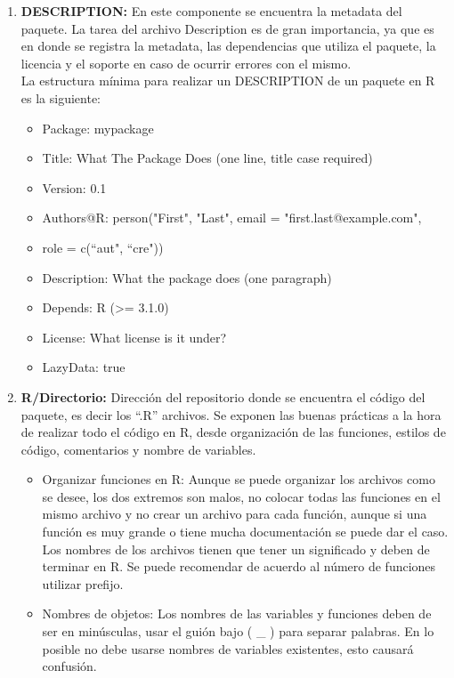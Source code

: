 \begin{enumerate}
  \item \textbf{ DESCRIPTION:} En este componente se encuentra la metadata del paquete. La tarea del archivo Description es de gran importancia, ya que es en donde se registra la metadata, las dependencias que utiliza el paquete, la licencia y el soporte en caso de ocurrir errores con el mismo.\\

La estructura m\'inima para realizar un DESCRIPTION de un paquete en R es la siguiente:

\begin{itemize}
\item Package: mypackage
\item Title: What The Package Does (one line, title case required)
\item Version: 0.1
\item Authors@R: person("First", "Last", email = "first.last@example.com",
\item role = c(``aut", ``cre"))
\item Description: What the package does (one paragraph)
\item Depends: R (>= 3.1.0)
\item License: What license is it under?
\item LazyData: true
\end{itemize}

 \item\textbf{ R/Directorio:}  Direcci\'on del repositorio donde se encuentra el c\'odigo del paquete, es decir los  ``.R'' archivos. Se exponen las buenas pr\'acticas a la hora de realizar todo el c\'odigo en R, desde organizaci\'on de las funciones, estilos de c\'odigo, comentarios y nombre de variables. 
\begin{itemize}
\item Organizar funciones en R: Aunque se puede organizar los archivos como se desee, los dos extremos son malos, no colocar todas las funciones en el mismo archivo y no crear un archivo para cada funci\'on, aunque si una funci\'on es muy grande o tiene mucha documentaci\'on se puede dar el caso. Los nombres de los archivos tienen que tener un significado y deben de terminar en R. Se puede recomendar de acuerdo al n\'umero de funciones utilizar prefijo.

\item Nombres de objetos: Los nombres de las variables y funciones deben de ser en min\'usculas, usar el gui\'on bajo ( \_ ) para separar palabras. En lo posible no debe usarse nombres de variables existentes, esto causar\'a confusi\'on.


\end{itemize}
\end{enumerate}

